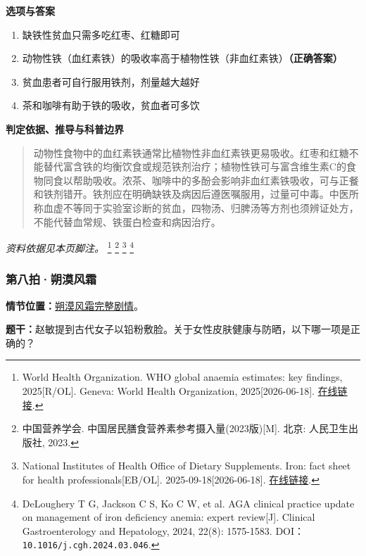 \textbf{选项与答案}
\begin{enumerate}[label=\Alph*.,leftmargin=*]
  \item 缺铁性贫血只需多吃红枣、红糖即可
  \item 动物性铁（血红素铁）的吸收率高于植物性铁（非血红素铁）\textbf{（正确答案）}
  \item 贫血患者可自行服用铁剂，剂量越大越好
  \item 茶和咖啡有助于铁的吸收，贫血者可多饮
\end{enumerate}
\textbf{判定依据、推导与科普边界}
\begin{quote}动物性食物中的血红素铁通常比植物性非血红素铁更易吸收。红枣和红糖不能替代富含铁的均衡饮食或规范铁剂治疗；植物性铁可与富含维生素C的食物同食以帮助吸收。浓茶、咖啡中的多酚会影响非血红素铁吸收，可与正餐和铁剂错开。铁剂应在明确缺铁及病因后遵医嘱服用，过量可中毒。中医所称血虚不等同于实验室诊断的贫血，四物汤、归脾汤等方剂也须辨证处方，不能代替血常规、铁蛋白检查和病因治疗。\end{quote}
\noindent\textit{资料依据见本页脚注。}
\footnote{World Health Organization. WHO global anaemia estimates: key findings, 2025[R/OL]. Geneva: World Health Organization, 2025[2026-06-18]. \href{https://www.who.int/publications/i/item/9789240113930}{在线链接}.}
\footnote{中国营养学会. 中国居民膳食营养素参考摄入量(2023版)[M]. 北京: 人民卫生出版社, 2023.}
\footnote{National Institutes of Health Office of Dietary Supplements. Iron: fact sheet for health professionals[EB/OL]. 2025-09-18[2026-06-18]. \href{https://ods.od.nih.gov/factsheets/Iron-HealthProfessional/}{在线链接}.}
\footnote{DeLoughery T G, Jackson C S, Ko C W, et al. AGA clinical practice update on management of iron deficiency anemia: expert review[J]. Clinical Gastroenterology and Hepatology, 2024, 22(8): 1575-1583. DOI：\nolinkurl{10.1016/j.cgh.2024.03.046}.}

\subsubsection{第八拍·朔漠风霜}\label{question:zhaomin:8}
\textbf{情节位置：}\hyperref[plot:zhaomin:8]{朔漠风霜完整剧情}。

\textbf{题干：}赵敏提到古代女子以铅粉敷脸。关于女性皮肤健康与防晒，以下哪一项是正确的？


